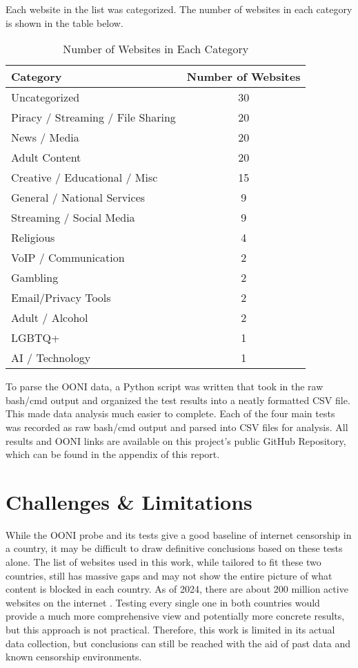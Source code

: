 Each website in the list was categorized. The number of websites in each category is shown in the table below.

\begin{table}[H]
\centering
\caption{Number of Websites in Each Category}
\begin{tabular}{lc}
\toprule
\textbf{Category} & \textbf{Number of Websites} \\
\midrule
Uncategorized & 30 \\
Piracy / Streaming / File Sharing & 20 \\
News / Media & 20 \\
Adult Content & 20 \\
Creative / Educational / Misc & 15 \\
General / National Services & 9 \\
Streaming / Social Media & 9 \\
Religious & 4 \\
VoIP / Communication & 2 \\
Gambling & 2 \\
Email/Privacy Tools & 2 \\
Adult / Alcohol & 2 \\
LGBTQ+ & 1 \\
AI / Technology & 1 \\
\bottomrule
\end{tabular}
\label{tab:website_category_amount}
\end{table}

To parse the OONI data, a Python script was written that took in the raw bash/cmd output and organized the test results into a neatly formatted CSV file. This made data analysis much easier to complete. Each of the four main tests was recorded as raw bash/cmd output and parsed into CSV files for analysis. All results and OONI links are available on this project's public GitHub Repository, which can be found in the appendix of this report.

\section{Challenges \& Limitations}

While the OONI probe and its tests give a good baseline of internet censorship in a country, it may be difficult to draw definitive conclusions based on these tests alone. The list of websites used in this work, while tailored to fit these two countries, still has massive gaps and may not show the entire picture of what content is blocked in each country. As of 2024, there are about 200 million active websites on the internet \cite{digitalsilkManyWebsites}. Testing every single one in both countries would provide a much more comprehensive view and potentially more concrete results, but this approach is not practical. Therefore, this work is limited in its actual data collection, but conclusions can still be reached with the aid of past data and known censorship environments.


